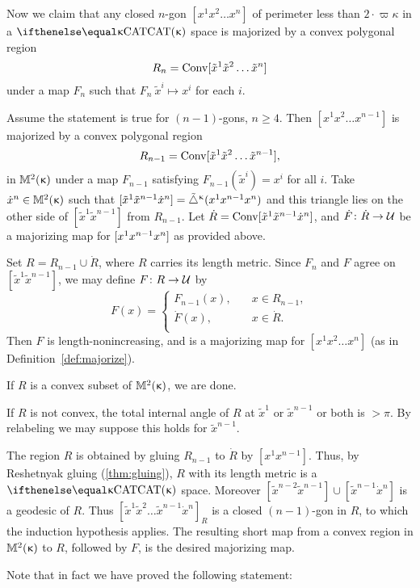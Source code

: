 Now we claim that any closed $n$-gon $[x^1x^2 \dots x^n ]$ of perimeter less than $2\cdot \varpi\kappa$ in a $\CAT{\kappa}$ space  is majorized by a convex polygonal region \[R_n=\Conv[\tilde x^1\tilde x^2\dots\tilde x^n]\]
under a map $F_n$ such that $F_n\:\tilde x^i\mapsto x^i$ for each $i$. 


Assume the statement is true for $(n-1)$-gons, $n\ge 4$.  
Then  $[x^1 x^2 \dots x^{n-1}]$  is majorized by a convex polygonal region 
\[R_{n-1}=\Conv[\tilde x^1 \tilde x^2 \dots \tilde x^{n-1}],\] 
in $\mathbb{M}_{{}}^{2}({\upkappa})$ under a map $F_{n-1}$ satisfying $F_{n-1}(\tilde x^i)=x^i$ for all $i$. 
Take $\dot x^n\in\Lob2{\kappa}$ such that $[{\tilde x^1}{\tilde x^{n-1}}{\dot x^n}]={\tilde\triangle}^{\upkappa}(x^1 x^{n-1} x^n)$ 
and this triangle lies on the other side of $[\tilde x^1\tilde x^{n-1}]$ from $R_{n-1}$.  
Let $\dot R\z=\Conv\trig{\tilde x^1}{\tilde x^{n-1}}{\dot x^n}$, 
and $\dot F\:\dot R\to \spc{U}$ be a majorizing map for $[{ x^1}{x^{n-1}}{ x^n}]$ as provided above.

Set 
$R= R_{n-1}\cup \dot R$, where $R$ carries its length metric.
Since $F_n$ and $F$ agree on $[\tilde x^1 \tilde x^{n-1}]$, we may define $F\:R\to\spc{U}$ by 
\[
F(x)=
\begin{cases}
F_{n-1}(x),\quad & x\in R_{n-1},\\
\dot F(x),\quad & x\in \dot R.\\
\end{cases}
\]
Then $F$ is length-nonincreasing, and is a majorizing map for $[x^1 x^2 \dots x^n ]$ (as in Definition~\ref{def:majorize}).

If $R$ is a convex subset of $\mathbb{M}_{{}}^{2}({\upkappa})$, we are done. 

If $R$ is not convex,  the total internal angle of $R$ at $\tilde x^1$ or $ \tilde x^{n-1} $ or both is $>\pi$.  
By relabeling we may suppose this  holds for $\tilde x^{n-1}$.  

The region $R$ is obtained by gluing $R_{n-1}$ to $\dot R$ by $[x^1x^{n-1}]$.
Thus, by Reshetnyak gluing (\ref{thm:gluing}), $R$ with its length metric is a $\CAT{\kappa}$ space.  
Moreover $[\tilde x^{n-2}\tilde x^{n-1}]\cup[\tilde x^{n-1} \dot x^n]$ is a geodesic of $R$.
Thus $[\tilde x^1 \tilde x^2 \dots \tilde x^{n-1} \dot x^n]_R$ is a closed $(n-1)$-gon in $R$, to which the induction hypothesis applies. The resulting short map from a convex region in $ \mathbb{M}_{{}}^{2}({\upkappa})$ to $R$, followed by $F$,  is the desired majorizing map.

\medskip

Note that in fact we have proved the following statement:


